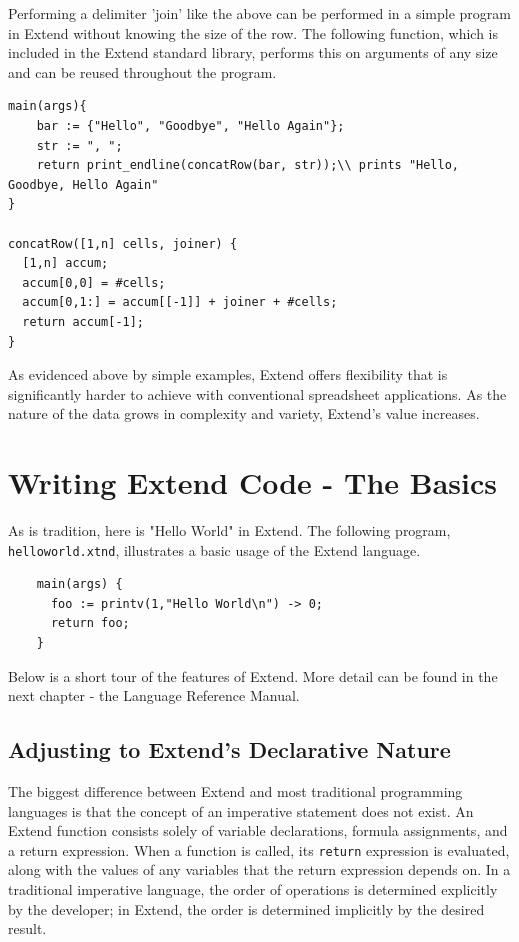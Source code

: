 \medskip \noindent Performing a delimiter 'join' like the above can be performed in a simple program in Extend without knowing the size of the row. The following function, which is included in the Extend standard library, performs this on arguments of any size and can be reused throughout the program.

\begin{lstlisting}
main(args){
	bar := {"Hello", "Goodbye", "Hello Again"};
	str := ", ";
	return print_endline(concatRow(bar, str));\\ prints "Hello, Goodbye, Hello Again"
}

concatRow([1,n] cells, joiner) {
  [1,n] accum;
  accum[0,0] = #cells;
  accum[0,1:] = accum[[-1]] + joiner + #cells;
  return accum[-1];
}
\end{lstlisting}

\medskip \noindent As evidenced above by simple examples, Extend offers flexibility that is significantly harder to achieve with conventional spreadsheet applications. As the nature of the data grows in complexity and variety, Extend's value increases.

\section{Writing Extend Code - The Basics}
As is tradition, here is "Hello World" in Extend. The following program, \texttt{helloworld.xtnd}, illustrates a basic usage of the Extend language.

\begin{lstlisting}
	main(args) {
	  foo := printv(1,"Hello World\n") -> 0;
	  return foo;
	}
\end{lstlisting}

\medskip \noindent
Below is a short tour of the features of Extend. More detail can be found in the next chapter - the Language Reference Manual.

	\subsection{Adjusting to Extend's Declarative Nature}
	The biggest difference between Extend and most traditional programming languages is that the concept of an imperative statement does not exist. An Extend function consists solely of variable declarations, formula assignments, and a return expression. When a function is called, its \texttt{return} expression is evaluated, along with the values of any variables that the return expression depends on. In a traditional imperative language, the order of operations is determined explicitly by the developer; in Extend, the order is determined implicitly by the desired result.

